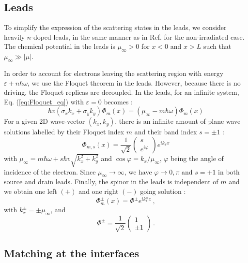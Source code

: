 \documentclass[aps,prb,showpacs,superscriptaddress,twocolumn,10pt,floatfix]{revtex4-1}
\newcommand{\ep}{\varepsilon}
\begin{document}
\subsection{Leads}
To simplify the expression of the scattering states in the leads, we consider heavily $n$-doped leads, in the same manner as in Ref.  for the non-irradiated case. The chemical potential in the leads is $\mu_\infty>0$ for $x<0$ and $x>L$ such that $\mu_{\infty}\gg|\mu|$.

In order to account for electrons leaving the scattering region with energy $\ep+n\hbar\omega$, we use the Floquet theorem in the leads. However, because there is no driving, the Floquet replicas are decoupled.
In the leads, for an infinite system, Eq. (\ref{eq:Floquet_eq}) with $\ep=0$ becomes :
\begin{equation}
 \hbar v\left(  \sigma_x k_x  + \sigma_y k_y \right)  \Phi_m(x) =  (\mu_{\infty} - m \hbar\omega)   \Phi_m(x)
\end{equation}
For a given 2D wave-vector $(k_x,k_y)$, there is an infinite amount of plane wave solutions labelled by their Floquet index $m$ and their band index $s=\pm1$ :
\begin{equation}
\Phi_{m,s} (x)=\frac{1}{\sqrt{2}}\begin{pmatrix}
s  \\ 
e^{i \varphi}
\end{pmatrix} e^{i k_x x  }
\end{equation}
with $\mu_{\infty} =m\hbar\omega+ s\hbar v\sqrt{k_x^2+k_y^2}$ and $\cos \varphi = k_x / \mu_\infty$, $\varphi$ being the angle of incidence of the electron. Since $\mu_\infty \rightarrow \infty$, we have $\varphi \rightarrow 0, \pi$ and $s=+1$ in both source and drain leads. Finally, the spinor in the leads is independent of $m$ and we obtain one left $(+)$ and one right $(-)$ going solution :
\begin{equation}
\Phi_m^\pm (x)
=\Phi^\pm e^{i k_x^\pm x}  \, ,
\label{eq:wave_leads}
\end{equation}
with $k_x^\pm = \pm \mu_\infty$, and
\begin{equation}
\Phi^\pm =\frac{1}{\sqrt{2}}\begin{pmatrix}
1  \\ 
\pm  1
\end{pmatrix} 
  \, .
\label{eq:wave_leads1}
\end{equation}

\subsection{Matching at the interfaces}
\end{document}
